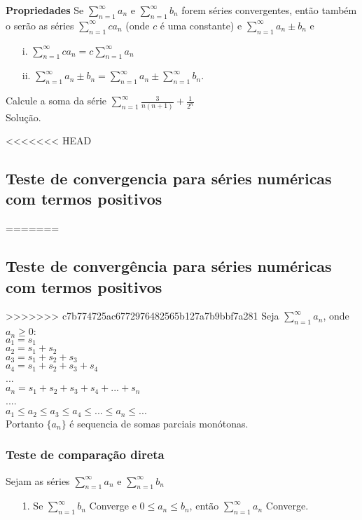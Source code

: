 \begin{ex}
\textbf{Propriedades} 
Se $\sum_{n=1}^{\infty} a_{n}$ e $\sum_{n=1}^{\infty} b_{n}$ forem séries convergentes, então também o serão as séries $\sum_{n=1}^{\infty} ca_{n}$ (onde $c$ é uma constante) e $\sum_{n=1}^{\infty} a_{n}\pm b_{n}$ e
\begin{itemize}
\item[i.] $\sum_{n=1}^{\infty} ca_{n}=c\sum_{n=1}^{\infty} a_{n}$

\item[ii.] $\sum_{n=1}^{\infty} a_{n}\pm b_{n}=\sum_{n=1}^{\infty} a_{n}\pm \sum_{n=1}^{\infty} b_{n}$.
\end{itemize}

\begin{ex}
	Calcule a soma da série $\sum_{n=1}^{\infty}\frac{3}{n(n+1)}+\frac{1}{2^{n}}$ \\
	Solução.
\end{ex}
<<<<<<< HEAD
\subsection{Teste de convergencia para séries numéricas com termos positivos}
=======
\subsection{Teste de convergência para séries numéricas com termos positivos}
>>>>>>> c7b774725ac6772976482565b127a7b9bbf7a281
Seja $\sum_{n=1}^{\infty}a_{n}$, onde $a_{n}\geq 0$:\\
$a_{1}=s_{1}$\\
$a_{2}=s_{1}+s_{2}$\\
$a_{3}=s_{1}+s_{2}+s_{3}$\\
$a_{4}=s_{1}+s_{2}+s_{3}+s_{4}$\\
...\\
$a_{n}=s_{1}+s_{2}+s_{3}+s_{4}+...+s_{n}$\\
....\\

$a_{1}\leq a_{2}\leq a_{3} \leq a_{4}\leq ...\leq a_{n}\leq...$\\

Portanto $\{a_{n}\}$ é sequencia de somas parciais monótonas.
\subsubsection{Teste de comparação direta}
Sejam as séries $\sum_{n=1}^{\infty}a_{n}$ e $\sum_{n=1}^{\infty}b_{n}$\\
\begin{itemize}
	\item[1.] Se $\sum_{n=1}^{\infty}b_{n}$ Converge e $0\leq a_{n}\leq b_{n}$, então $\sum_{n=1}^{\infty}a_{n}$ Converge.
	

\end{itemize}
\end{ex}
